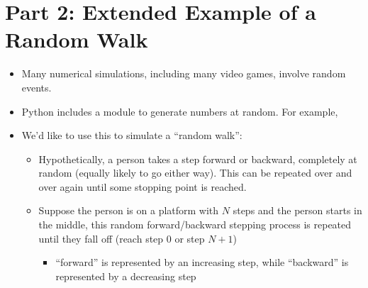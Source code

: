 \documentclass[letterpaper,10pt,english]{sphinxmanual}
\begin{document}
\section{Part 2:  Extended Example of a Random Walk}
\label{\detokenize{lecture_notes/lec11_conditionals2:part-2-extended-example-of-a-random-walk}}\begin{itemize}
\item {} 
Many numerical simulations, including many video games, involve random
events.

\item {} 
Python includes a module to generate numbers at random. For
example,

%
\begin{sphinxVerbatim}[commandchars=\\\{\}]
 


\end{sphinxVerbatim}

\item {} 
We’d like to use this to simulate a “random walk”:
\begin{itemize}
\item {} 
Hypothetically, a person takes a step forward or backward,
completely at random (equally likely to go either way).  This
can be repeated over and over again until some stopping point is
reached.

\item {} 
Suppose the person is on a platform with \(N\) steps and the person
starts in the middle, this random forward/backward stepping
process is repeated until they fall off (reach step 0 or step
\(N+1\))
\begin{itemize}
\item {} 
“forward” is represented by an increasing step, while
“backward” is represented by a decreasing step


\end{itemize}
\end{itemize}
\end{itemize}
\end{document}
